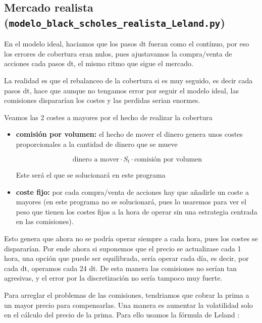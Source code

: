 \documentclass[11pt]{article}
\newcommand{\mult}[0]{\!\cdot\!} %
\begin{document}
			\subsection{Mercado realista (\texttt{modelo\_black\_scholes\_realista\_Leland.py})} 
				En el modelo ideal, haciamos que los pasos dt fueran como el contínuo, por eso los errores de cobertura eran nulos, pues ajustavamos la compra/venta de acciones cada pasos dt, el mismo ritmo que sigue el mercado.
				
				La realidad es que el rebalanceo de la cobertura si es muy seguido, es decir cada pasos dt, hace que aunque no tengamos error por seguir el modelo ideal, las comisiones dispararían los costes y las perdidas serian enormes.
				
				Veamos las 2 costes a mayores por el hecho de realizar la cobertura
				
				\begin{itemize}
					\item \textbf{comisión por volumen:} el hecho de mover el dinero genera unos costes proporcionales a la cantidad de dinero que se mueve
					
					\begin{equation*}
						\text{dinero a mover} \mult S_t \mult \text{comisión por volumen} 
					\end{equation*}
					
					Este será el que se solucionará en este programa
					
					\item \textbf{coste fijo:} por cada compra/venta de acciones hay que añadirle un coste a mayores (en este programa no se solucionará, pues lo usaremos para ver el peso que tienen los costes fijos a la hora de operar sin una estrategia centrada en las comisiones).
				\end{itemize} 
				
				Esto genera que ahora no se podría operar siempre a cada hora, pues los costes se dispararían. Por ende ahora si suponemos que el precio se actualizase cada 1 hora, una opción que puede ser equilibrada, sería operar cada día, es decir, por cada dt, operamos cada 24 dt. De esta manera las comisiones no serían tan agresivas, y el error por la discretización no sería tampoco muy fuerte.
				
				Para arreglar el problemas de las comisiones, tendriamos que cobrar la prima a un mayor precio para compensarlas. Una manera es aumentar la volatilidad solo en el cálculo del precio de la prima. Para ello usamos la fórmula de Leland \cite{leland1985option}:
				
\end{document}
